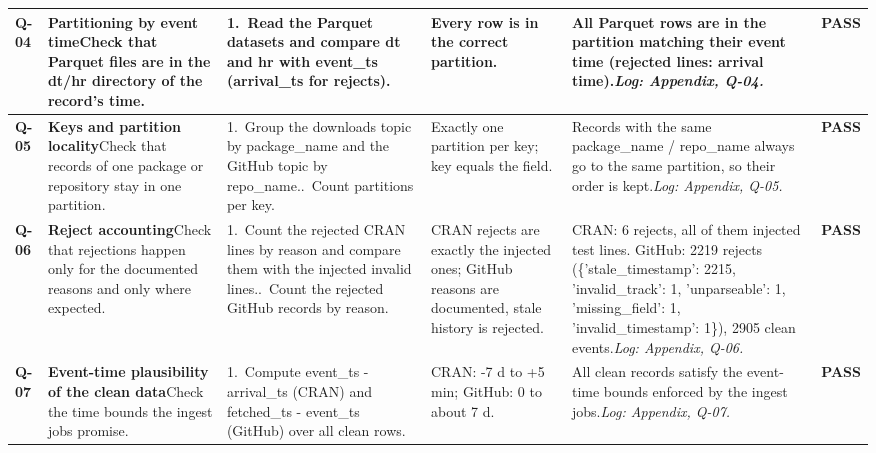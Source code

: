 {\begin{longtable}{@{}L{1.1cm}L{5.8cm}L{5.4cm}L{3.9cm}L{5.5cm}L{1.3cm}@{}}
\midrule[0.3pt]
\textbf{Q-04} & \textbf{Partitioning by event time}\newline Check that Parquet files are in the dt/\allowbreak{}hr directory of the record's time. & 1.~Read the Parquet datasets and compare dt and hr with event\_\allowbreak{}ts (arrival\_\allowbreak{}ts for rejects). & Every row is in the correct partition. & All Parquet rows are in the partition matching their event time (rejected lines: arrival time).\newline \textit{Log: Appendix, Q-04.} & \textbf{\textcolor{green!45!black}{PASS}} \\
\midrule[0.3pt]
\textbf{Q-05} & \textbf{Keys and partition locality}\newline Check that records of one package or repository stay in one partition. & 1.~Group the downloads topic by package\_\allowbreak{}name and the GitHub topic by repo\_\allowbreak{}name..~Count partitions per key. & Exactly one partition per key; key equals the field. & Records with the same package\_\allowbreak{}name /\allowbreak{} repo\_\allowbreak{}name always go to the same partition, so their order is kept.\newline \textit{Log: Appendix, Q-05.} & \textbf{\textcolor{green!45!black}{PASS}} \\
\midrule[0.3pt]
\textbf{Q-06} & \textbf{Reject accounting}\newline Check that rejections happen only for the documented reasons and only where expected. & 1.~Count the rejected CRAN lines by reason and compare them with the injected invalid lines..~Count the rejected GitHub records by reason. & CRAN rejects are exactly the injected ones; GitHub reasons are documented, stale history is rejected. & CRAN: 6 rejects, all of them injected test lines. GitHub: 2219 rejects (\{'stale\_\allowbreak{}timestamp': 2215, 'invalid\_\allowbreak{}track': 1, 'unparseable': 1, 'missing\_\allowbreak{}field': 1, 'invalid\_\allowbreak{}timestamp': 1\}), 2905 clean events.\newline \textit{Log: Appendix, Q-06.} & \textbf{\textcolor{green!45!black}{PASS}} \\
\midrule[0.3pt]
\textbf{Q-07} & \textbf{Event-time plausibility of the clean data}\newline Check the time bounds the ingest jobs promise. & 1.~Compute event\_\allowbreak{}ts - arrival\_\allowbreak{}ts (CRAN) and fetched\_\allowbreak{}ts - event\_\allowbreak{}ts (GitHub) over all clean rows. & CRAN: -7 d to +5 min; GitHub: 0 to about 7 d. & All clean records satisfy the event-time bounds enforced by the ingest jobs.\newline \textit{Log: Appendix, Q-07.} & \textbf{\textcolor{green!45!black}{PASS}} \\
\midrule[0.3pt]
\end{longtable}}
